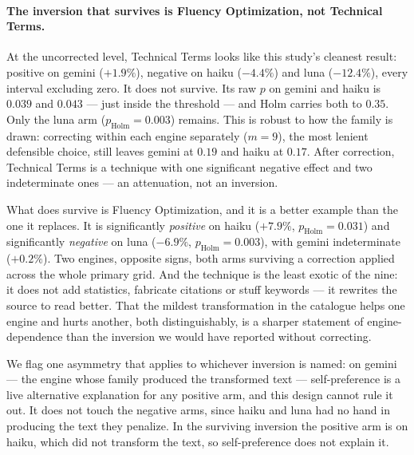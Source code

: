 \documentclass[11pt,a4paper]{article}
\begin{document}
\paragraph{The inversion that survives is Fluency Optimization, not Technical
Terms.} At the uncorrected level, Technical Terms looks like this study's
cleanest result: positive on gemini ($+1.9\%$), negative on haiku ($-4.4\%$)
and luna ($-12.4\%$), every interval excluding zero. It does not survive.
Its raw $p$ on gemini and haiku is $0.039$ and $0.043$ --- just inside the
threshold --- and Holm carries both to $0.35$. Only the luna arm
($p_{\text{Holm}} = 0.003$) remains. This is robust to how the family is
drawn: correcting within each engine separately ($m = 9$), the most lenient
defensible choice, still leaves gemini at $0.19$ and haiku at $0.17$. After
correction, Technical Terms is a technique with one significant negative
effect and two indeterminate ones --- an attenuation, not an inversion.

What does survive is Fluency Optimization, and it is a better example than
the one it replaces. It is significantly \emph{positive} on haiku
($+7.9\%$, $p_{\text{Holm}} = 0.031$) and significantly \emph{negative} on
luna ($-6.9\%$, $p_{\text{Holm}} = 0.003$), with gemini indeterminate
($+0.2\%$). Two engines, opposite signs, both arms surviving a correction
applied across the whole primary grid. And the technique is the least
exotic of the nine: it does not add statistics, fabricate citations or
stuff keywords --- it rewrites the source to read better. That the mildest
transformation in the catalogue helps one engine and hurts another, both
distinguishably, is a sharper statement of engine-dependence than the
inversion we would have reported without correcting.

We flag one asymmetry that applies to whichever inversion is named: on
gemini --- the engine whose family produced the transformed text ---
self-preference is a live alternative explanation for any positive arm, and
this design cannot rule it out. It does not touch the negative arms, since
haiku and luna had no hand in producing the text they penalize. In the
surviving inversion the positive arm is on haiku, which did not transform
the text, so self-preference does not explain it.
\end{document}
